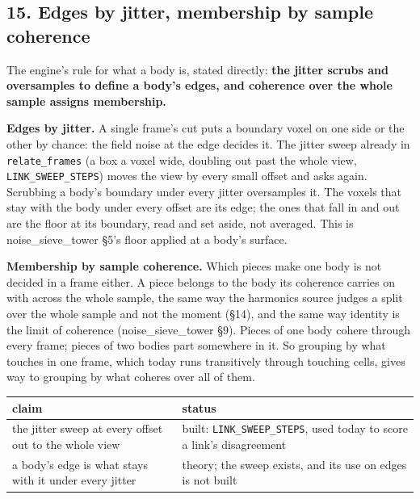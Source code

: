 \subsection{\texorpdfstring{15. Edges by jitter, membership by sample coherence}{15. Edges by jitter, membership by sample coherence}}

The engine's rule for what a body is, stated directly: \textbf{the jitter scrubs and oversamples to define a body's edges, and coherence over the whole sample assigns membership.}

\textbf{Edges by jitter.} A single frame's cut puts a boundary voxel on one side or the other by chance: the field noise at the edge decides it. The jitter sweep already in \texttt{relate\_\allowbreak{}frames} (a box a voxel wide, doubling out past the whole view, \texttt{LINK\_\allowbreak{}SWEEP\_\allowbreak{}STEPS}) moves the view by every small offset and asks again. Scrubbing a body's boundary under every jitter oversamples it. The voxels that stay with the body under every offset are its edge; the ones that fall in and out are the floor at its boundary, read and set aside, not averaged. This is noise\_\allowbreak{}sieve\_\allowbreak{}tower §5's floor applied at a body's surface.

\textbf{Membership by sample coherence.} Which pieces make one body is not decided in a frame either. A piece belongs to the body its coherence carries on with across the whole sample, the same way the harmonics source judges a split over the whole sample and not the moment (§14), and the same way identity is the limit of coherence (noise\_\allowbreak{}sieve\_\allowbreak{}tower §9). Pieces of one body cohere through every frame; pieces of two bodies part somewhere in it. So grouping by what touches in one frame, which today runs transitively through touching cells, gives way to grouping by what coheres over all of them.

{\small
\setlength{\tabcolsep}{6pt}
\begin{longtable}{>{\RaggedRight\arraybackslash}p{}>{\RaggedRight\arraybackslash}p{}}
\toprule
claim & status \\
\midrule
\endhead
the jitter sweep at every offset out to the whole view & built: \texttt{LINK\_\allowbreak{}SWEEP\_\allowbreak{}STEPS}, used today to score a link's disagreement \\
a body's edge is what stays with it under every jitter & theory; the sweep exists, and its use on edges is not built \\
\bottomrule
\end{longtable}
}


